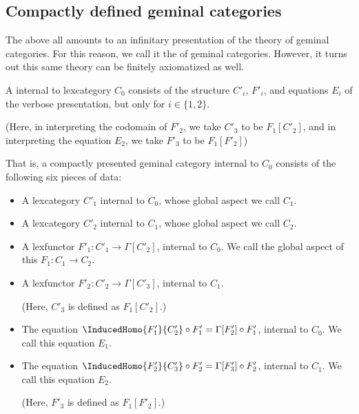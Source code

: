 \subsection{Compactly defined geminal categories}
The above all amounts to an infinitary presentation of the theory of geminal categories. For this reason, we call it the  of geminal categories. However, it turns out this same theory can be finitely axiomatized as well.

\begin{definition}\label{CompactGeminalCatDefn}
A  internal to lexcategory $C_0$ consists of the structure $C'_i$, $F'_i$, and equations $E_i$ of the verbose presentation, but only for $i \in \{1, 2\}$.

(Here, in interpreting the codomain of $F'_2$, we take $C'_3$ to be $F_1[C'_2]$, and in interpreting the equation $E_2$, we take $F'_3$ to be $F_1[F'_2]$)

That is, a compactly presented geminal category internal to $C_0$ consists of the following six pieces of data:

\begin{itemize}
    \item A lexcategory $C'_1$ internal to $C_0$, whose global aspect we call $C_1$.
    
    \item A lexcategory $C'_2$ internal to $C_1$, whose global aspect we call $C_2$.
    
    \item A lexfunctor $F'_1 : C'_1 \to \Gamma[C'_2]$, internal to $C_0$. We call the global aspect of this $F_1 : C_1 \to C_2$.
    
    \item A lexfunctor $F'_2 : C'_2 \to \Gamma[C'_3]$, internal to $C_1$.
    
    (Here, $C'_3$ is defined as $F_1[C'_2]$.)
    
    \item The equation $\InducedHomo{F'_1}{C'_{2}} \circ F'_1 = \Gamma[F'_2] \circ F'_1$, internal to $C_0$. We call this equation $E_1$.
    
    \item The equation $\InducedHomo{F'_2}{C'_{3}} \circ F'_2 = \Gamma[F'_3] \circ F'_2$, internal to $C_1$. We call this equation $E_2$.
    
    (Here, $F'_3$ is defined as $F_1[F'_2]$.)
\end{itemize}
\end{definition}

